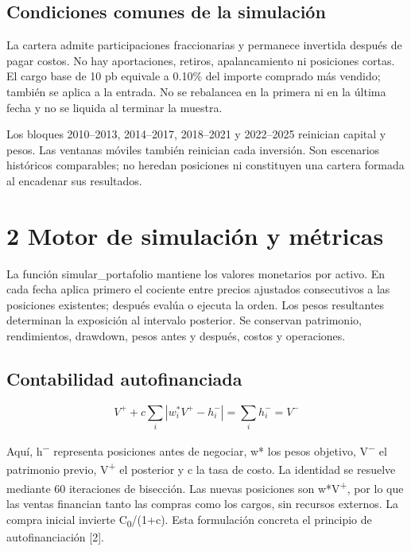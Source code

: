\documentclass[11pt,letterpaper]{article}
\begin{document}
\subsection*{Condiciones comunes de la simulación}

La cartera admite participaciones fraccionarias y permanece invertida después de pagar costos. No hay aportaciones, retiros, apalancamiento ni posiciones cortas. El cargo base de 10 pb equivale a 0.10\% del importe comprado más vendido; también se aplica a la entrada. No se rebalancea en la primera ni en la última fecha y no se liquida al terminar la muestra.

Los bloques 2010--2013, 2014--2017, 2018--2021 y 2022--2025 reinician capital y pesos. Las ventanas móviles también reinician cada inversión. Son escenarios históricos comparables; no heredan posiciones ni constituyen una cartera formada al encadenar sus resultados.


\clearpage

\section*{2 Motor de simulación y métricas}

La función simular\_portafolio mantiene los valores monetarios por activo. En cada fecha aplica primero el cociente entre precios ajustados consecutivos a las posiciones existentes; después evalúa o ejecuta la orden. Los pesos resultantes determinan la exposición al intervalo posterior. Se conservan patrimonio, rendimientos, drawdown, pesos antes y después, costos y operaciones.

\subsection*{Contabilidad autofinanciada}

\[
V^{+}+c\sum_i\left|w_i^{*}V^{+}-h_i^{-}\right|=\sum_i h_i^{-}=V^{-}
\]

Aquí, h\textsuperscript{\ensuremath{-}} representa posiciones antes de negociar, w* los pesos objetivo, V\textsuperscript{\ensuremath{-}} el patrimonio previo, V\textsuperscript{+} el posterior y c la tasa de costo. La identidad se resuelve mediante 60 iteraciones de bisección. Las nuevas posiciones son w*V\textsuperscript{+}, por lo que las ventas financian tanto las compras como los cargos, sin recursos externos. La compra inicial invierte C\textsubscript{0}/(1+c). Esta formulación concreta el principio de autofinanciación [2].
\end{document}
